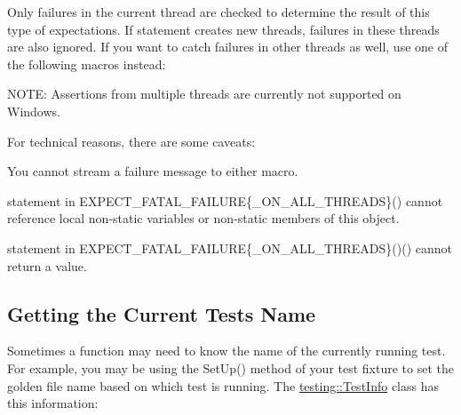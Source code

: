 Only failures in the current thread are checked to determine the result of this type of expectations. If {\ttfamily statement} creates new threads, failures in these threads are also ignored. If you want to catch failures in other threads as well, use one of the following macros instead\+:


\begin{DoxyCode}{0}
\end{DoxyCode}


N\+O\+TE\+: Assertions from multiple threads are currently not supported on Windows.

For technical reasons, there are some caveats\+:


\begin{DoxyEnumerate}
\item You cannot stream a failure message to either macro.
\end{DoxyEnumerate}
\begin{DoxyEnumerate}
\item {\ttfamily statement} in {\ttfamily E\+X\+P\+E\+C\+T\+\_\+\+F\+A\+T\+A\+L\+\_\+\+F\+A\+I\+L\+U\+RE\{\+\_\+\+O\+N\+\_\+\+A\+L\+L\+\_\+\+T\+H\+R\+E\+A\+DS\}()} cannot reference local non-\/static variables or non-\/static members of {\ttfamily this} object.
\end{DoxyEnumerate}
\begin{DoxyEnumerate}
\item {\ttfamily statement} in {\ttfamily E\+X\+P\+E\+C\+T\+\_\+\+F\+A\+T\+A\+L\+\_\+\+F\+A\+I\+L\+U\+RE\{\+\_\+\+O\+N\+\_\+\+A\+L\+L\+\_\+\+T\+H\+R\+E\+A\+DS\}()()} cannot return a value.
\end{DoxyEnumerate}

\subsection*{Getting the Current Test\textquotesingle{}s Name}

Sometimes a function may need to know the name of the currently running test. For example, you may be using the {\ttfamily Set\+Up()} method of your test fixture to set the golden file name based on which test is running. The {\ttfamily \mbox{\hyperlink{classtesting_1_1_test_info}{testing\+::\+Test\+Info}}} class has this information\+:


\begin{DoxyCode}{0}
\DoxyCodeLine{}
\DoxyCodeLine{  //}
\DoxyCodeLine{\};}
\DoxyCodeLine{}
\DoxyCodeLine{\}}
\end{DoxyCode}


